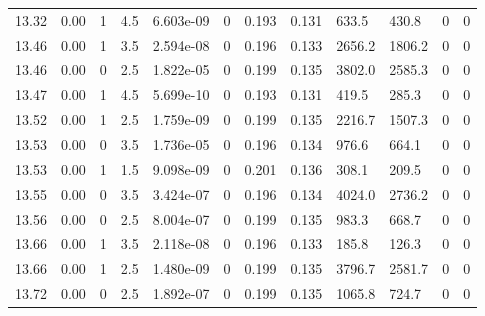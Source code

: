 \documentclass[preview]{standalone}
\begin{document}
{{{{{{{{{{{{{\begin{tabular}{L{1.2cm}C{1.2cm} C{0.3cm}C{0.5cm} C{1.4cm}C{1.4cm} C{1.4cm}C{1.4cm} C{1.6cm}C{1.6cm} C{1.6cm}C{1.6cm}}
  13.32  &  0.00  & 1     & 4.5 &  6.603e-09  & 0  &  0.193&   0.131& 633.5 & 430.8   &  0 & 0  \\ 
  13.46  &  0.00  & 1     & 3.5 &  2.594e-08  & 0  &  0.196&   0.133& 2656.2 & 1806.2   &  0 & 0  \\ 
  13.46  &  0.00  & 0     & 2.5 &  1.822e-05  & 0  &  0.199&   0.135& 3802.0 & 2585.3   &  0 & 0  \\ 
  13.47  &  0.00  & 1     & 4.5 &  5.699e-10  & 0  &  0.193&   0.131& 419.5 & 285.3   &  0 & 0  \\ 
  13.52  &  0.00  & 1     & 2.5 &  1.759e-09  & 0  &  0.199&   0.135& 2216.7 & 1507.3   &  0 & 0  \\ 
  13.53  &  0.00  & 0     & 3.5 &  1.736e-05  & 0  &  0.196&   0.134& 976.6 & 664.1   &  0 & 0  \\ 
  13.53  &  0.00  & 1     & 1.5 &  9.098e-09  & 0  &  0.201&   0.136& 308.1 & 209.5   &  0 & 0  \\ 
  13.55  &  0.00  & 0     & 3.5 &  3.424e-07  & 0  &  0.196&   0.134& 4024.0 & 2736.2   &  0 & 0  \\ 
  13.56  &  0.00  & 0     & 2.5 &  8.004e-07  & 0  &  0.199&   0.135& 983.3 & 668.7   &  0 & 0  \\ 
  13.66  &  0.00  & 1     & 3.5 &  2.118e-08  & 0  &  0.196&   0.133& 185.8 & 126.3   &  0 & 0  \\ 
  13.66  &  0.00  & 1     & 2.5 &  1.480e-09  & 0  &  0.199&   0.135& 3796.7 & 2581.7   &  0 & 0  \\ 
  13.72  &  0.00  & 0     & 2.5 &  1.892e-07  & 0  &  0.199&   0.135& 1065.8 & 724.7   &  0 & 0  \\ 
\hline 
\end{tabular} 

}}}}}}}}}}}}}
\end{document}
